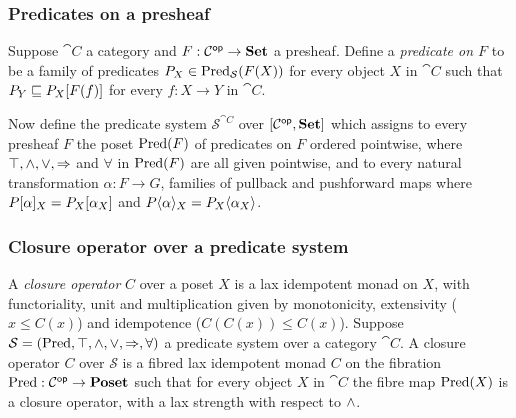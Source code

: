 \subsubsection{Predicates on a presheaf}

Suppose $\cat{C}$ a category and $F: \mathcal{C}^{\mathsf{op}} \to \mathbf{Set}$ a presheaf. Define a \emph{predicate on $F$} to be
a family of predicates $P_X \in \mathrm{Pred}_\mathcal{S}(F(X))$ for every object $X$ in $\cat{C}$ such that $P_Y
\sqsubseteq P_X[F(f)]$ for every $f: X \to Y$ in $\cat{C}$.

Now define the predicate system $\mathcal{S}^{\cat{C}}$ over $[\mathcal{C}^{\mathsf{op}},\mathbf{Set}]$ which assigns to every
presheaf $F$ the poset $\mathrm{Pred}(F)$ of predicates on $F$ ordered pointwise, where $\top, \wedge, \vee,
\Rightarrow$ and $\forall$ in $\mathrm{Pred}(F)$ are all given pointwise, and to every natural transformation $\alpha: F
\to G$, families of pullback and pushforward maps where $P[\alpha]_X = P_X[\alpha_X]$ and
$P\langle\alpha\rangle_X = P_X\langle\alpha_X\rangle$.

\subsubsection{Closure operator over a predicate system}

A \emph{closure operator} $C$ over a poset $X$ is a lax idempotent monad on $X$, with functoriality, unit and
multiplication given by monotonicity, extensivity ($x \leq C(x)$) and idempotence ($C(C(x)) \leq C(x)$).
Suppose $\mathcal{S} = (\mathrm{Pred}, \top, \wedge, \vee, \Rightarrow, \forall)$ a predicate system over a category
$\cat{C}$. A closure operator $C$ over $\mathcal{S}$ is a fibred lax idempotent monad $C$ on the fibration
$\mathrm{Pred}: \mathcal{C}^{\mathsf{op}} \to \mathbf{Poset}$ such that for every object $X$ in $\cat{C}$ the fibre map $\mathrm{Pred}(X)$ is a
closure operator, with a lax strength with respect to $\wedge$.
